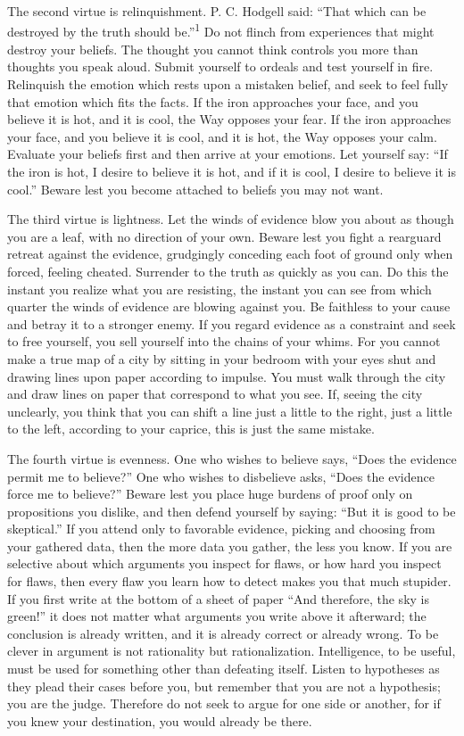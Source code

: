 {
 The second virtue is relinquishment. P. C. Hodgell said:
``That which can be destroyed by the truth should
be.''\textsuperscript{1} Do not flinch from
experiences that might destroy your beliefs. The thought you cannot
think controls you more than thoughts you speak aloud. Submit yourself
to ordeals and test yourself in fire. Relinquish the emotion which
rests upon a mistaken belief, and seek to feel fully that emotion which
fits the facts. If the iron approaches your face, and you believe it is
hot, and it is cool, the Way opposes your fear. If the iron approaches
your face, and you believe it is cool, and it is hot, the Way opposes
your calm. Evaluate your beliefs first and then arrive at your
emotions. Let yourself say: ``If the iron is hot, I
desire to believe it is hot, and if it is cool, I desire to believe it
is cool.'' Beware lest you become attached to beliefs
you may not want.}

{
 The third virtue is lightness. Let the winds of evidence blow you
about as though you are a leaf, with no direction of your own. Beware
lest you fight a rearguard retreat against the evidence, grudgingly
conceding each foot of ground only when forced, feeling cheated.
Surrender to the truth as quickly as you can. Do this the instant you
realize what you are resisting, the instant you can see from which
quarter the winds of evidence are blowing against you. Be faithless to
your cause and betray it to a stronger enemy. If you regard evidence as
a constraint and seek to free yourself, you sell yourself into the
chains of your whims. For you cannot make a true map of a city by
sitting in your bedroom with your eyes shut and drawing lines upon
paper according to impulse. You must walk through the city and draw
lines on paper that correspond to what you see. If, seeing the city
unclearly, you think that you can shift a line just a little to the
right, just a little to the left, according to your caprice, this is
just the same mistake.}

{
 The fourth virtue is evenness. One who wishes to believe says,
``Does the evidence permit me to
believe?'' One who wishes to disbelieve asks,
``Does the evidence force me to
believe?'' Beware lest you place huge burdens of
proof only on propositions you dislike, and then defend yourself by
saying: ``But it is good to be
skeptical.'' If you attend only to favorable
evidence, picking and choosing from your gathered data, then the more
data you gather, the less you know. If you are selective about which
arguments you inspect for flaws, or how hard you inspect for flaws,
then every flaw you learn how to detect makes you that much stupider.
If you first write at the bottom of a sheet of paper
``And therefore, the sky is green!''
it does not matter what arguments you write above it afterward; the
conclusion is already written, and it is already correct or already
wrong. To be clever in argument is not rationality but rationalization.
Intelligence, to be useful, must be used for something other than
defeating itself. Listen to hypotheses as they plead their cases before
you, but remember that you are not a hypothesis; you are the judge.
Therefore do not seek to argue for one side or another, for if you knew
your destination, you would already be there.}


